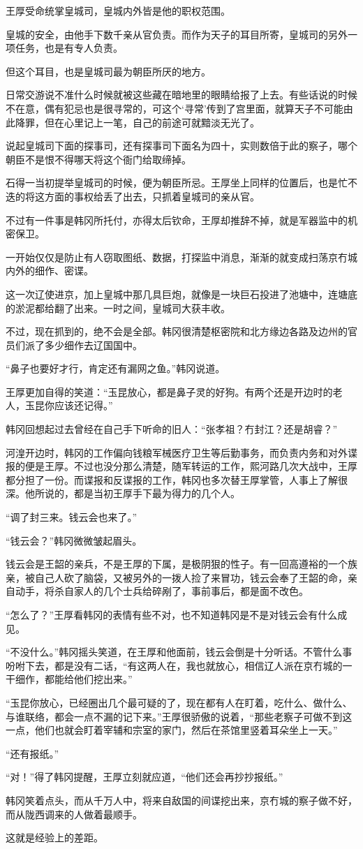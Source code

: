 王厚受命统掌皇城司，皇城内外皆是他的职权范围。

皇城的安全，由他手下数千亲从官负责。而作为天子的耳目所寄，皇城司的另外一项任务，也是有专人负责。

但这个耳目，也是皇城司最为朝臣所厌的地方。

日常交游说不准什么时候就被这些藏在暗地里的眼睛给报了上去。有些话说的时候不在意，偶有犯忌也是很寻常的，可这个‘寻常’传到了宫里面，就算天子不可能由此降罪，但在心里记上一笔，自己的前途可就黯淡无光了。

说起皇城司下面的探事司，还有探事司下面名为四十，实则数倍于此的察子，哪个朝臣不是恨不得哪天将这个衙门给取缔掉。

石得一当初提举皇城司的时候，便为朝臣所忌。王厚坐上同样的位置后，也是忙不迭的将这方面的事权给丢了出去，只抓着皇城司的亲从官。

不过有一件事是韩冈所托付，亦得太后钦命，王厚却推辞不掉，就是军器监中的机密保卫。

一开始仅仅是防止有人窃取图纸、数据，打探监中消息，渐渐的就变成扫荡京冇城内外的细作、密谍。

这一次辽使进京，加上皇城中那几具巨炮，就像是一块巨石投进了池塘中，连塘底的淤泥都给翻了出来。一时之间，皇城司大获丰收。

不过，现在抓到的，绝不会是全部。韩冈很清楚枢密院和北方缘边各路及边州的官员们派了多少细作去辽国国中。

“鼻子也要好才行，肯定还有漏网之鱼。”韩冈说道。

王厚更加自得的笑道：“玉昆放心，都是鼻子灵的好狗。有两个还是开边时的老人，玉昆你应该还记得。”

韩冈回想起过去曾经在自己手下听命的旧人：“张孝祖？冇封江？还是胡睿？”

河湟开边时，韩冈的工作偏向钱粮军械医疗卫生等后勤事务，而负责内务和对外谍报的便是王厚。不过也没分那么清楚，随军转运的工作，熙河路几次大战中，王厚都分担了一份。而谍报和反谍报的工作，韩冈也多次替王厚掌管，人事上了解很深。他所说的，都是当初王厚手下最为得力的几个人。

“调了封三来。钱云会也来了。”

“钱云会？”韩冈微微皱起眉头。

钱云会是王韶的亲兵，不是王厚的下属，是极阴狠的性子。有一回高遵裕的一个族亲，被自己人砍了脑袋，又被另外的一拨人捡了来冒功，钱云会奉了王韶的命，亲自动手，将杀自家人的几个士兵给碎剐了，事前事后，都是面不改色。

“怎么了？”王厚看韩冈的表情有些不对，也不知道韩冈是不是对钱云会有什么成见。

“不没什么。”韩冈摇头笑道，在王厚和他面前，钱云会倒是十分听话。不管什么事吩咐下去，都是没有二话，“有这两人在，我也就放心，相信辽人派在京冇城的一干细作，都能给他们挖出来。”

“玉昆你放心，已经圈出几个最可疑的了，现在都有人在盯着，吃什么、做什么、与谁联络，都会一点不漏的记下来。”王厚很骄傲的说着，“那些老察子可做不到这一点，他们也就会盯着宰辅和宗室的家门，然后在茶馆里竖着耳朵坐上一天。”

“还有报纸。”

“对！”得了韩冈提醒，王厚立刻就应道，“他们还会再抄抄报纸。”

韩冈笑着点头，而从千万人中，将来自敌国的间谍挖出来，京冇城的察子做不好，而从陇西调来的人做着最顺手。

这就是经验上的差距。

